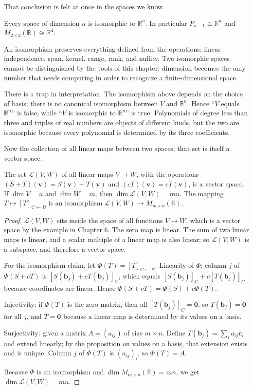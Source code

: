 That conclusion is felt at once in the spaces we know.

\begin{akibat}
Every space of dimension $n$ is isomorphic to $\mathbb{R}^{n}$. In particular
$P_{n-1}\cong\mathbb{R}^{n}$ and $M_{2\times2}(\mathbb{R})\cong\mathbb{R}^{4}$.
\end{akibat}

An isomorphism preserves everything defined from the operations: linear independence, span,
kernel, range, rank, and nullity. Two isomorphic spaces cannot be distinguished
by the tools of this chapter; dimension becomes the only number that needs computing in order to recognize
a finite-dimensional space.

There is a trap in interpretation. The isomorphism above depends on the choice of
basis; there is no canonical isomorphism between $V$ and $\mathbb{R}^{n}$. Hence ``$V$ equals
$\mathbb{R}^{n}$'' is false, while ``$V$ is isomorphic to $\mathbb{R}^{n}$'' is
true.
Polynomials of degree less than three and triples of real numbers are objects of different kinds,
but the two are isomorphic because every polynomial is determined by its three coefficients.

Now the collection of all linear maps between two spaces; that set is itself a vector space.

\begin{teorema}
The set $\mathcal{L}(V,W)$ of all linear maps $V\to W$, with the operations
$(S+T)(\mathbf{v})=S(\mathbf{v})+T(\mathbf{v})$ and $(cT)(\mathbf{v})=cT(\mathbf{v})$,
is
a vector space. If $\dim V=n$ and $\dim W=m$, then $\dim\mathcal{L}(V,W)=mn$. The mapping
$T\mapsto[T]_{C\leftarrow B}$ is an isomorphism $\mathcal{L}(V,W)\to M_{m\times n}(\mathbb{R})$.
\end{teorema}

\begin{proof}
$\mathcal{L}(V,W)$ sits inside the space of all functions $V\to W$, which is a vector space
by the example in Chapter 6. The zero map is linear. The sum of two linear maps is linear, and a scalar multiple of a
linear
map is also linear; so $\mathcal{L}(V,W)$ is a subspace, and therefore a vector space.

For the isomorphism claim, let $\Phi(T)=[T]_{C\leftarrow B}$. Linearity of $\Phi$: column
$j$ of $\Phi(S+cT)$ is $[S(\mathbf{b}_{j})+cT(\mathbf{b}_{j})]_{C}$, which equals
$[S(\mathbf{b}_{j})]_{C}+c[T(\mathbf{b}_{j})]_{C}$ because coordinates are linear. Hence
$\Phi(S+cT)=\Phi(S)+c\Phi(T)$.

Injectivity: if $\Phi(T)$ is the zero matrix, then all $[T(\mathbf{b}_{j})]_{C}=\mathbf{0}$, so
$T(\mathbf{b}_{j})=\mathbf{0}$ for all $j$, and $T=\mathbf{0}$ because a linear map is
determined by its values on a basis.

Surjectivity: given a matrix $A=(a_{ij})$ of size $m\times n$. Define
$T(\mathbf{b}_{j})=\sum_{i}a_{ij}\mathbf{c}_{i}$ and extend linearly; by the
proposition
on values on a basis, that extension exists and is unique. Column $j$ of $\Phi(T)$ is
$(a_{ij})_{i}$, so $\Phi(T)=A$.

Because $\Phi$ is an isomorphism and $\dim M_{m\times n}(\mathbb{R})=mn$, we get
$\dim\mathcal{L}(V,W)=mn$.
\end{proof}


